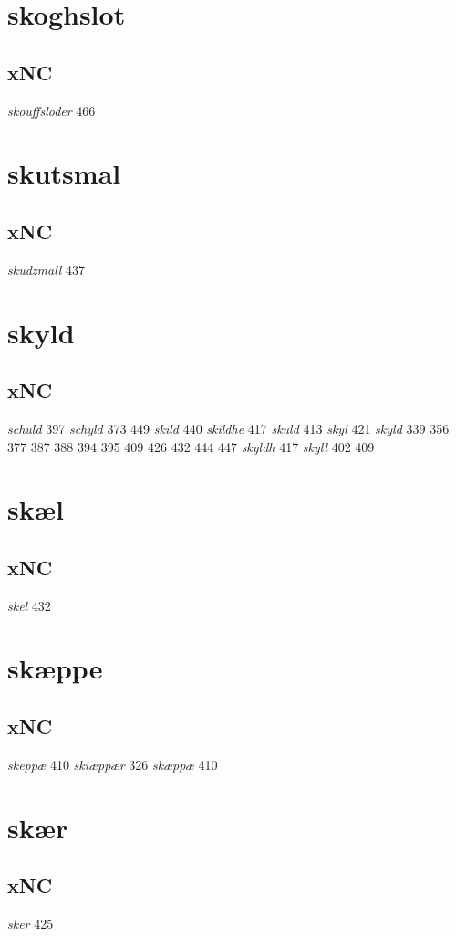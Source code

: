 \documentclass[a4paper,twocolumn]{article}
\begin{document}
\section{skoghslot}
\label{sec:org43b7e45}
\subsection{xNC}
\label{sec:org6d3a142}
\emph{skouffsloder} 466 
\section{skutsmal}
\label{sec:orgc1698b5}
\subsection{xNC}
\label{sec:orgd766b18}
\emph{skudzmall} 437 
\section{skyld}
\label{sec:org801e0fa}
\subsection{xNC}
\label{sec:org509964f}
\emph{schuld} 397 \emph{schyld} 373 449 \emph{skild} 440 \emph{skildhe} 417 \emph{skuld} 413 \emph{skyl} 421 \emph{skyld} 339 356 377 387 388 394 395 409 426 432 444 447 \emph{skyldh} 417 \emph{skyll} 402 409 
\section{skæl}
\label{sec:orgceb2934}
\subsection{xNC}
\label{sec:orgd513b86}
\emph{skel} 432 
\section{skæppe}
\label{sec:org0d625d8}
\subsection{xNC}
\label{sec:org8023806}
\emph{skeppæ} 410 \emph{skiæppær} 326 \emph{skæppæ} 410 
\section{skær}
\label{sec:org54066e5}
\subsection{xNC}
\label{sec:org9d4c2c2}
\emph{sker} 425 
\end{document}
